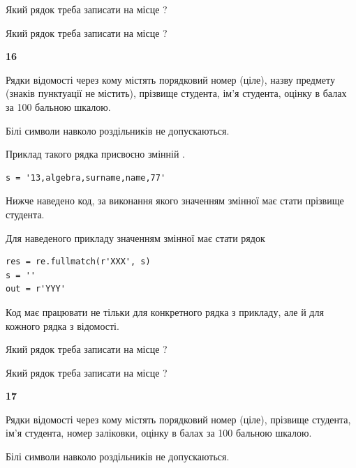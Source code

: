 Який рядок треба записати на місце  ?\par
\vspace{5mm}


Який рядок треба записати на місце  ?\par


\newpage

{\begin {center}\textbf{ 16}\end {center}}\par
Рядки відомості через кому містять порядковий номер (ціле), назву предмету (зна\-ків пунктуації не містить), прізвище студента, ім'я студента, оцінку в балах за 100 бальною шкалою.

Білі символи навколо роздільників не допускаються.

Приклад такого рядка присвоєно змінній .



\begin{verbatim}
s = '13,algebra,surname,name,77'
\end{verbatim}


Нижче наведено код, за виконання якого значенням змінної  має стати прізвище студента.

Для наведеного прикладу значенням змінної  має стати рядок 



\begin{verbatim}
res = re.fullmatch(r'XXX', s)
s = ''
out = r'YYY'
\end{verbatim}


Код має працювати не тільки для конкретного рядка з прикладу, але й для кожного рядка з відомості.




Який рядок треба записати на місце  ?\par
\vspace{5mm}


Який рядок треба записати на місце  ?\par


\newpage

{\begin {center}\textbf{ 17}\end {center}}\par
Рядки відомості через кому містять порядковий номер (ціле), пріз\-ви\-ще студен\-та, ім'я студента, номер заліковки, оцінку в балах за 100 бальною шкалою.

Білі символи навколо роздільників не допускаються.

